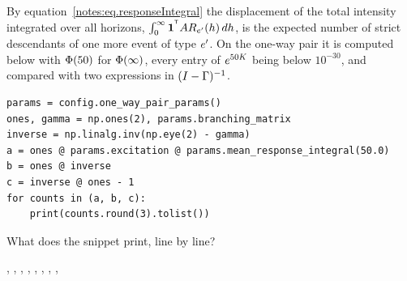 \begin{question}
\label{question.responseIntegralCountsStrictDescendants}
By equation~\eqref{notes:eq.responseIntegral}
the displacement of the total intensity integrated over all horizons,
$\int_{0}^{\infty} \mathbf{1}^{^{\mathsf{T}}}A R_{e^{\prime}}(h) \, dh$,
is the expected number of strict descendants of one more event of type $e^{\prime}$.
On the one-way pair it is computed below with $\Phi(50)$ for $\Phi(\infty)$,
every entry of $e^{50K}$ being below $10^{-30}$,
and compared with two expressions in $(I - \Gamma)^{-1}$.
\begin{lstlisting}[caption={Descendants of one more event}, label=listing.responseIntegralCountsStrictDescendants]
params = config.one_way_pair_params()
ones, gamma = np.ones(2), params.branching_matrix
inverse = np.linalg.inv(np.eye(2) - gamma)
a = ones @ params.excitation @ params.mean_response_integral(50.0)
b = ones @ inverse
c = inverse @ ones - 1
for counts in (a, b, c):
    print(counts.round(3).tolist())
\end{lstlisting}
What does the snippet print, line by line?
\begin{choices}
 \choice \codehl{[3.375, 1.5]}, \codehl{[4.375, 2.5]}, \codehl{[3.375, 1.5]}
 \choice \codehl{[4.375, 2.5]}, \codehl{[4.375, 2.5]}, \codehl{[0.25, 4.625]}
 \choice \codehl{[0.25, 4.625]}, \codehl{[1.25, 5.625]}, \codehl{[0.25, 4.625]}
 \correctchoice \codehl{[3.375, 1.5]}, \codehl{[4.375, 2.5]}, \codehl{[0.25, 4.625]}
\end{choices}
\end{question}

